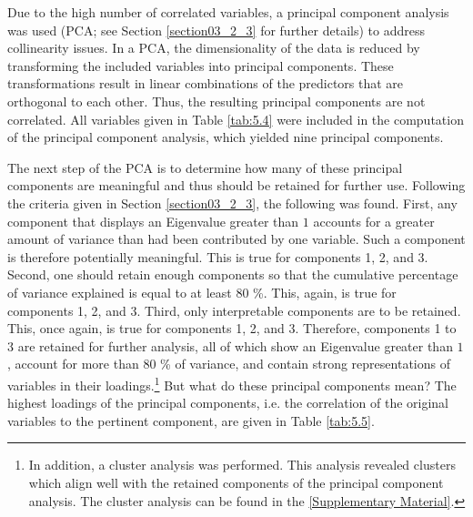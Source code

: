 Due to the high number of correlated variables, a principal component analysis was used (PCA; see Section \ref{section03_2_3} for further details) to address collinearity issues. In a PCA, the dimensionality of the data is reduced by transforming the included variables into principal components. These transformations result in linear combinations of the predictors that are orthogonal to each other. Thus, the resulting principal components are not correlated. All variables given in Table \ref{tab:5.4} were included in the computation of the principal component analysis, which yielded nine principal components. 

The next step of the PCA is to determine how many of these principal components are meaningful and thus should be retained for further use. Following the criteria given in Section \ref{section03_2_3}, the following was found. First, any component that displays an Eigenvalue greater than $1$ accounts for a greater amount of variance than had been contributed by one variable. Such a component is therefore potentially meaningful. This is true for components 1, 2, and 3. Second, one should retain enough components so that the cumulative percentage of variance explained is equal to at least 80 \%. This, again, is true for components 1, 2, and 3. Third, only interpretable components are to be retained. This, once again, is true for components 1, 2, and 3. Therefore, components 1 to 3 are retained for further analysis, all of which show an Eigenvalue greater than $1$, account for more than 80 \% of variance, and contain strong representations of variables in their loadings.\footnote{In addition, a cluster analysis was performed. This analysis revealed clusters which align well with the retained components of the principal component analysis. The cluster analysis can be found in the \ref{Supplementary Material}.} But what do these principal components mean? The highest loadings of the principal components, i.e. the correlation of the original variables to the pertinent component, are given in Table \ref{tab:5.5}.

